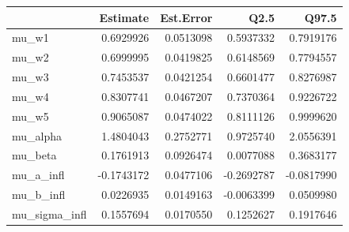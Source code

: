 
\begin{tabular}{lrrrr}
\toprule
  & Estimate & Est.Error & Q2.5 & Q97.5\\
\midrule
mu\_w1 & 0.6929926 & 0.0513098 & 0.5937332 & 0.7919176\\
mu\_w2 & 0.6999995 & 0.0419825 & 0.6148569 & 0.7794557\\
mu\_w3 & 0.7453537 & 0.0421254 & 0.6601477 & 0.8276987\\
mu\_w4 & 0.8307741 & 0.0467207 & 0.7370364 & 0.9226722\\
mu\_w5 & 0.9065087 & 0.0474022 & 0.8111126 & 0.9999620\\
\addlinespace
mu\_alpha & 1.4804043 & 0.2752771 & 0.9725740 & 2.0556391\\
mu\_beta & 0.1761913 & 0.0926474 & 0.0077088 & 0.3683177\\
mu\_a\_infl & -0.1743172 & 0.0477106 & -0.2692787 & -0.0817990\\
mu\_b\_infl & 0.0226935 & 0.0149163 & -0.0063399 & 0.0509980\\
mu\_sigma\_infl & 0.1557694 & 0.0170550 & 0.1252627 & 0.1917646\\
\bottomrule
\end{tabular}
